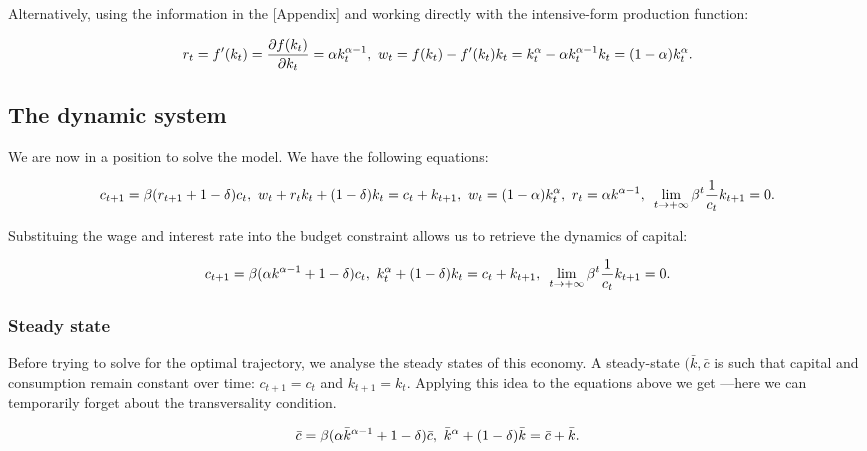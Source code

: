\documentclass[11pt,a4paper,english]{article}
\begin{document}
Alternatively, using the information in the {[}Appendix{]} and working
directly with the intensive-form production function:

\[r_{t} = f^{\prime}(k_{t}) = \frac{\partial f(k_{t})}{\partial k_{t}} = \alpha k_{t}^{\alpha -1}, \\\
  w_{t} = f(k_{t}) - f^{\prime}(k_{t})k_{t} = k_{t}^{\alpha} - \alpha k_{t}^{\alpha - 1} k_{t} = (1-\alpha)k_{t}^{\alpha}.\]

\hypertarget{the-dynamic-system}{%
\subsection{The dynamic system}\label{the-dynamic-system}}

We are now in a position to solve the model. We have the following
equations:

\[ c_{t+1} = \beta (r_{t+1} + 1 - \delta) c_{t}, \\\
   w_{t} + r_{t}k_{t} + (1-\delta) k_{t} = c_{t} + k_{t+1}, \\\
   w_{t} = (1-\alpha) k^{\alpha}_{t}, \\\
   r_{t} = \alpha k^{\alpha-1}, \\\
   \lim_{t \rightarrow +\infty} \beta^{t}\frac{1}{c_{t}} k_{t+1} = 0.\]

Substituing the wage and interest rate into the budget constraint allows
us to retrieve the dynamics of capital:

\[ c_{t+1} = \beta (\alpha k^{\alpha-1} + 1 - \delta) c_{t}, \\\
   k_{t}^{\alpha} + (1-\delta) k_{t} = c_{t} + k_{t+1}, \\\
   \lim_{t \rightarrow +\infty} \beta^{t}\frac{1}{c_{t}} k_{t+1} = 0.\]

\hypertarget{steady-state}{%
\subsubsection{Steady state}\label{steady-state}}

Before trying to solve for the optimal trajectory, we analyse the steady
states of this economy. A steady-state \((\bar{k}, \bar{c}\) is such
that capital and consumption remain constant over time:
\(c_{t+1} = c_{t}\) and \(k_{t+1} = k_{t}.\) Applying this idea to the
equations above we get ---here we can temporarily forget about the
transversality condition.

\[ \bar{c} = \beta(\alpha \bar{k}^{\alpha-1} + 1 - \delta) \bar{c}, \\\
   \bar{k}^{\alpha} + (1-\delta)\bar{k} = \bar{c} + \bar{k}.\]
\end{document}
